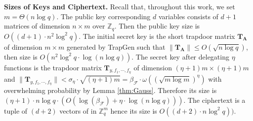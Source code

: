 \documentclass[runningheads,10pt]{llncs}
\begin{document}
\noindent 	 \textbf{Sizes of Keys and Ciphertext.} Recall that, throughout this work, we set $m=\Theta(n\log q)$. The public key corresponding  $d$ variables consists of $d+1$ matrices of dimension $n\times m$ over $\mathbb{Z}_q$. Then the public key size is $O((d+1)\cdot n^2 \log^2 q)$. The initial secret key is the short trapdoor matrix $\textbf{T}_\textbf{A}$ of dimension $m\times m$ generated by \textsf{TrapGen} such that $\|\textbf{T}_\textbf{A}\| \leq O(\sqrt{n \log q})$, then size is $O(n^2 \log^2 q\cdot \log( n\log q))$. The secret key after delegating $\eta$ functions  is the trapdoor matrix $\textbf{T}_{y,f_1, \cdots, f_\eta}$ of dimension $(\eta+1)m \times (\eta+1)m$ and    $\| \textbf{T}_{y,f_1, \cdots, f_\eta} \| <\sigma_\eta\cdot \sqrt{(\eta+1)m}=\beta_{\mathcal{F}}\cdot \omega((\sqrt{m\log m})^{\eta})$ with overwhelming probability by Lemma \ref{thm:Gauss}. Therefore its size is  $ (\eta+1) \cdot n \log q \cdot( O(\log(\beta_{\mathcal{F}})+\eta\cdot \log (n \log q)))$. The ciphertext is a tuple of $(d+2)$ vectors of in $\mathbb{Z}^m_q$ hence its size is $O((d+2)\cdot n\log^2q))$. 
\end{document}

